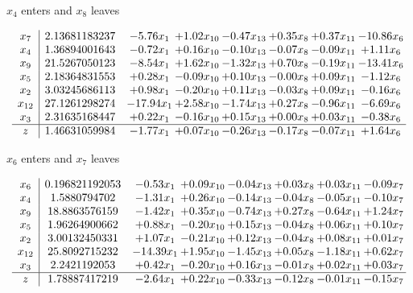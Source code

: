 \documentclass[9pt]{article}
\begin{document}
 $ x_{4} $ enters and $ x_{8} $ leaves 

 \[\begin{array}{c| c c@{\hskip 2pt} c@{\hskip 2pt} c@{\hskip 2pt} c@{\hskip 2pt} c@{\hskip 2pt} c@{\hskip 2pt} }
 x_{7}   &  2.13681183237 & -5.76 x_{1} & +  1.02 x_{10} & -0.47 x_{13} & +  0.35 x_{8} & +  0.37 x_{11} & -10.86 x_{6}\\
 x_{4}   &  1.36894001643 & -0.72 x_{1} & +  0.16 x_{10} & -0.10 x_{13} & -0.07 x_{8} & -0.09 x_{11} & +  1.11 x_{6}\\
 x_{9}   &  21.5267050123 & -8.54 x_{1} & +  1.62 x_{10} & -1.32 x_{13} & +  0.70 x_{8} & -0.19 x_{11} & -13.41 x_{6}\\
 x_{5}   &  2.18364831553 & +  0.28 x_{1} & -0.09 x_{10} & +  0.10 x_{13} & -0.00 x_{8} & +  0.09 x_{11} & -1.12 x_{6}\\
 x_{2}   &  3.03245686113 & +  0.98 x_{1} & -0.20 x_{10} & +  0.11 x_{13} & -0.03 x_{8} & +  0.09 x_{11} & -0.16 x_{6}\\
 x_{12}   &  27.1261298274 & -17.94 x_{1} & +  2.58 x_{10} & -1.74 x_{13} & +  0.27 x_{8} & -0.96 x_{11} & -6.69 x_{6}\\
 x_{3}   &  2.31635168447 & +  0.22 x_{1} & -0.16 x_{10} & +  0.15 x_{13} & +  0.00 x_{8} & +  0.03 x_{11} & -0.38 x_{6}\\
\hline
z    &  1.46631059984 & -1.77 x_{1} & +  0.07 x_{10} & -0.26 x_{13} & -0.17 x_{8} & -0.07 x_{11} & +  1.64 x_{6}\\
\end{array}\]


 $ x_{6} $ enters and $ x_{7} $ leaves 

 \[\begin{array}{c| c c@{\hskip 2pt} c@{\hskip 2pt} c@{\hskip 2pt} c@{\hskip 2pt} c@{\hskip 2pt} c@{\hskip 2pt} }
 x_{6}   &  0.196821192053 & -0.53 x_{1} & +  0.09 x_{10} & -0.04 x_{13} & +  0.03 x_{8} & +  0.03 x_{11} & -0.09 x_{7}\\
 x_{4}   &  1.5880794702 & -1.31 x_{1} & +  0.26 x_{10} & -0.14 x_{13} & -0.04 x_{8} & -0.05 x_{11} & -0.10 x_{7}\\
 x_{9}   &  18.8863576159 & -1.42 x_{1} & +  0.35 x_{10} & -0.74 x_{13} & +  0.27 x_{8} & -0.64 x_{11} & +  1.24 x_{7}\\
 x_{5}   &  1.96264900662 & +  0.88 x_{1} & -0.20 x_{10} & +  0.15 x_{13} & -0.04 x_{8} & +  0.06 x_{11} & +  0.10 x_{7}\\
 x_{2}   &  3.00132450331 & +  1.07 x_{1} & -0.21 x_{10} & +  0.12 x_{13} & -0.04 x_{8} & +  0.08 x_{11} & +  0.01 x_{7}\\
 x_{12}   &  25.8092715232 & -14.39 x_{1} & +  1.95 x_{10} & -1.45 x_{13} & +  0.05 x_{8} & -1.18 x_{11} & +  0.62 x_{7}\\
 x_{3}   &  2.2421192053 & +  0.42 x_{1} & -0.20 x_{10} & +  0.16 x_{13} & -0.01 x_{8} & +  0.02 x_{11} & +  0.03 x_{7}\\
\hline
z    &  1.78887417219 & -2.64 x_{1} & +  0.22 x_{10} & -0.33 x_{13} & -0.12 x_{8} & -0.01 x_{11} & -0.15 x_{7}\\
\end{array}\]
\end{document}
